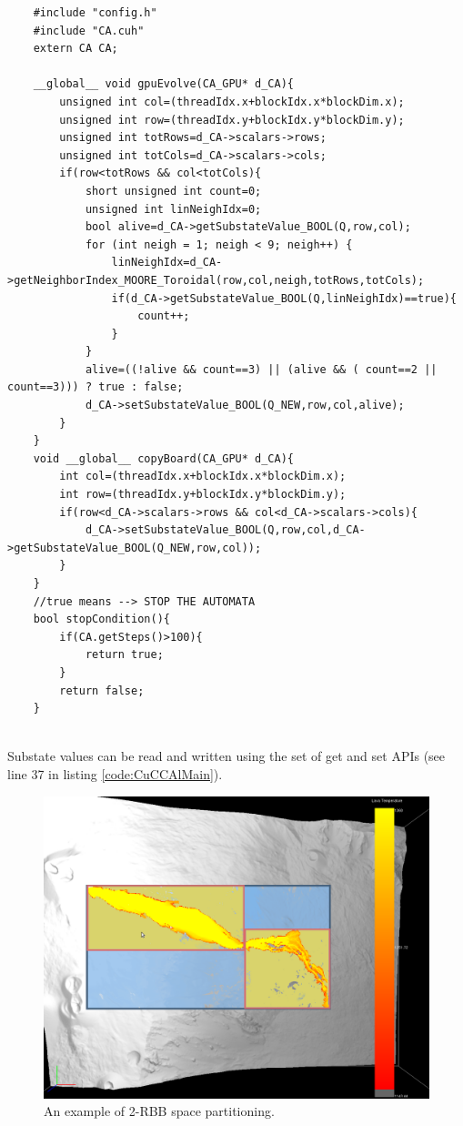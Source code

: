 \begin{lstlisting}
	#include "config.h"
	#include "CA.cuh"
	extern CA CA;
	
	__global__ void gpuEvolve(CA_GPU* d_CA){
		unsigned int col=(threadIdx.x+blockIdx.x*blockDim.x);
		unsigned int row=(threadIdx.y+blockIdx.y*blockDim.y);
		unsigned int totRows=d_CA->scalars->rows;
		unsigned int totCols=d_CA->scalars->cols;
		if(row<totRows && col<totCols){
			short unsigned int count=0;
			unsigned int linNeighIdx=0;
			bool alive=d_CA->getSubstateValue_BOOL(Q,row,col);
			for (int neigh = 1; neigh < 9; neigh++) {
				linNeighIdx=d_CA->getNeighborIndex_MOORE_Toroidal(row,col,neigh,totRows,totCols);
				if(d_CA->getSubstateValue_BOOL(Q,linNeighIdx)==true){
					count++;
				}
			}
			alive=((!alive && count==3) || (alive && ( count==2 || count==3))) ? true : false;
			d_CA->setSubstateValue_BOOL(Q_NEW,row,col,alive);
		}
	}
	void __global__ copyBoard(CA_GPU* d_CA){
		int col=(threadIdx.x+blockIdx.x*blockDim.x);
		int row=(threadIdx.y+blockIdx.y*blockDim.y);
		if(row<d_CA->scalars->rows && col<d_CA->scalars->cols){
			d_CA->setSubstateValue_BOOL(Q,row,col,d_CA->getSubstateValue_BOOL(Q_NEW,row,col));
		}
	}
	//true means --> STOP THE AUTOMATA
	bool stopCondition(){
		if(CA.getSteps()>100){
			return true;
		}
		return false;
	}
	
\end{lstlisting} 
Substate values can be read and written using the set of get and set APIs (see
line 37 in listing \ref{code:CuCCAlMain}).

   \begin{figure}
\begin{center}
  \includegraphics[scale=0.35]{./images/MultiRBBExample}
  \caption[2-RBB cellular space partitioning example]{An example of 2-RBB space
  partitioning.}
  \label{fig:MultiRBBExample}
\end{center}
\end{figure}

